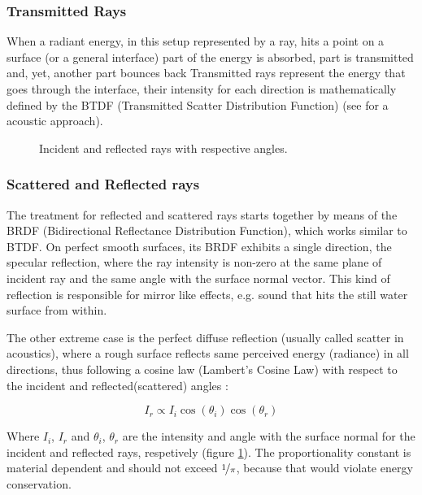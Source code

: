 \subsubsection{Transmitted Rays}
When a radiant energy, in this setup represented by a ray, hits a point on a
surface (or a general interface) part of the energy is absorbed, part is
transmitted and, yet, another part bounces back Transmitted rays represent the
energy that goes through the interface, their intensity for each direction is
mathematically defined by the BTDF (Transmitted Scatter Distribution
Function)\cite{bartell1981theory} (see \citet{rober2007ray} for a acoustic
approach).


\begin{figure}[h]
	\centering
	
	\caption{Incident and reflected rays with respective angles.}
	\label{fig:ray_reflect}
\end{figure}


\subsubsection{Scattered and Reflected rays}
The treatment for reflected and scattered rays starts together by means of the
BRDF (Bidirectional Reflectance Distribution
Function)\cite{blake1995remote,miller2015real,durany2015analytical}, which works
similar to BTDF. On perfect smooth surfaces, its BRDF exhibits a single
direction, the specular reflection, where the ray intensity is non-zero at the
same plane of incident ray and the same angle with the surface normal vector.
This kind of reflection is responsible for mirror like effects, e.g. sound that hits
the still water surface from within\cite{LURTON,Etter2013}.

The other extreme case is the perfect diffuse reflection (usually called scatter
in acoustics), where a rough surface reflects same perceived energy (radiance)
in all directions, thus following a cosine law (Lambert's Cosine Law) with
respect to the incident and reflected(scattered) angles
\cite{united1977geometrical,cox2004acoustic}:

\begin{equation}
\label{eq:lambert}
I_r \propto	 I_i \cos(\theta_i) \cos(\theta_r)
\end{equation}

Where $I_i$,  $I_r$ and $\theta_i$, $\theta_r$ are the intensity and angle with
the surface normal for the incident and reflected rays,
respetively (figure \ref{fig:ray_reflect}). The proportionality constant is
material dependent and should not exceed $\nicefrac{1}{\pi}$, because that would violate
energy conservation.


